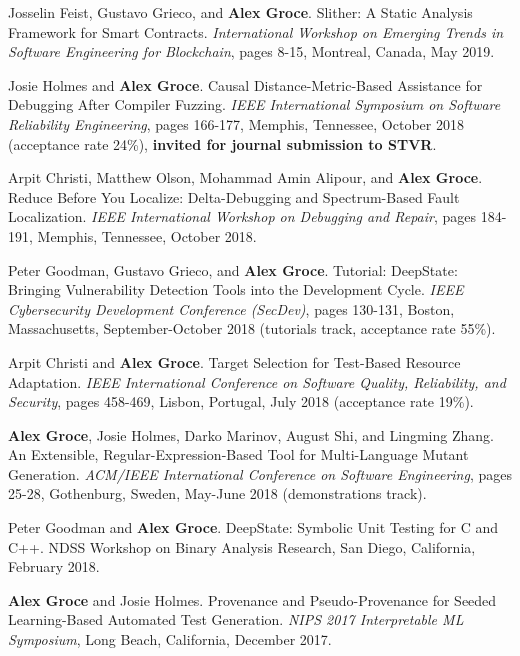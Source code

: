 \documentclass[ComputerScience]{vita}
\begin{document}
\begin{vita}
\begin{Refereed Conference and Workshop Publications}
\item Josselin Feist, Gustavo Grieco, and {\bf Alex Groce}. 
\newblock Slither: A Static Analysis Framework for Smart Contracts. 
\newblock \emph{International Workshop on Emerging Trends in Software
  Engineering for Blockchain}, pages 8-15, Montreal,
Canada, May 2019.
  
\item Josie Holmes and {\bf Alex Groce}. 
\newblock Causal Distance-Metric-Based Assistance for Debugging After 
Compiler Fuzzing. 
\newblock \emph{IEEE International Symposium on Software Reliability 
  Engineering}, pages 166-177, Memphis, Tennessee, October 
2018 (acceptance rate 24\%), {\bf invited for journal submission to STVR}.

\item Arpit Christi, Matthew Olson, Mohammad Amin Alipour, and {\bf Alex Groce}. 
\newblock Reduce Before You Localize: Delta-Debugging and Spectrum-Based Fault Localization. 
\newblock \emph{IEEE International Workshop on Debugging and Repair},
pages 184-191, Memphis, Tennessee, October  2018.

\item Peter Goodman, Gustavo Grieco,  and {\bf Alex Groce}. 
\newblock Tutorial: DeepState: Bringing Vulnerability Detection Tools 
into the Development Cycle. 
\newblock \emph{IEEE Cybersecurity Development Conference (SecDev)},
pages 130-131, Boston, Massachusetts, September-October 2018 (tutorials track, 
acceptance rate 55\%). 

\item Arpit Christi and {\bf Alex Groce}.
\newblock Target Selection for Test-Based Resource Adaptation.
\newblock \emph{IEEE International Conference on Software Quality,
  Reliability, and Security}, pages 458-469, 
Lisbon, Portugal, July 2018 (acceptance rate 19\%).

\item {\bf Alex Groce},  Josie Holmes, Darko Marinov, August Shi, and Lingming Zhang.
\newblock An Extensible, Regular-Expression-Based Tool for Multi-Language Mutant Generation.
\newblock \emph{ACM/IEEE International Conference on Software
  Engineering}, pages 25-28, Gothenburg, Sweden, May-June 2018 (demonstrations track).

\item Peter Goodman and {\bf Alex Groce}.
\newblock DeepState: Symbolic Unit Testing for C and C++.
\newblock NDSS Workshop on Binary Analysis Research, San Diego, California, February 2018.

\item {\bf Alex Groce} and Josie Holmes.
\newblock Provenance and Pseudo-Provenance for Seeded Learning-Based Automated Test Generation.
\newblock \emph{NIPS 2017 Interpretable ML Symposium}, Long Beach, California, December 2017.


\end{Refereed Conference and Workshop Publications}
\end{vita}
\end{document}
